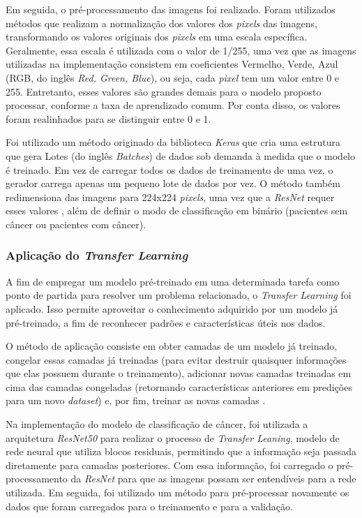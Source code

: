 Em seguida, o pré-processamento das imagens foi realizado. Foram utilizados métodos que realizam a normalização dos valores dos \textit{pixels} das imagens, transformando os valores originais dos \textit{pixels} em uma escala específica. Geralmente, essa escala é utilizada com o valor de 1/255, uma vez que as imagens utilizadas na implementação consistem em coeficientes Vermelho, Verde, Azul (RGB, do inglês \textit{Red, Green, Blue}), ou seja, cada \textit{pixel} tem um valor entre 0 e 255. Entretanto, esses valores são grandes demais para o modelo proposto processar, conforme a taxa de aprendizado comum. Por conta disso, os valores foram realinhados para se distinguir entre 0 e 1.

Foi utilizado um método originado da biblioteca \textit{Keras} que cria uma estrutura que gera Lotes (do inglês \textit{Batches}) de dados sob demanda à medida que o modelo é treinado. Em vez de carregar todos os dados de treinamento de uma vez, o gerador carrega apenas um pequeno lote de dados por vez. O método também redimensiona das imagens para 224x224 \textit{pixels}, uma vez que a \textit{ResNet} requer esses valores \cite{kerasresnet50}, além de definir o modo de classificação em binário (pacientes sem câncer ou pacientes com câncer).



\subsubsection{\esp Aplicação do \textit{Transfer Learning}} \label{transfer}

A fim de empregar um modelo pré-treinado em uma determinada tarefa como ponto de partida para resolver um problema relacionado, o \textit{Transfer Learning} foi aplicado. Isso permite aproveitar o conhecimento adquirido por um modelo já pré-treinado, a fim de reconhecer padrões e características úteis nos dados. 

O método de aplicação consiste em obter camadas de um modelo já treinado, congelar essas camadas já treinadas (para evitar destruir quaisquer informações que elas possuem durante o treinamento), adicionar novas camadas treinadas em cima das camadas congeladas (retornando características anteriores em predições para um novo \textit{dataset}) e, por fim, treinar as novas camadas \cite{kerastransfer}.

Na implementação do modelo de classificação de câncer, foi utilizada a arquitetura \textit{ResNet50} para realizar o processo de \textit{Transfer Leaning}, modelo de rede neural que utiliza blocos residuais, permitindo que a informação seja passada diretamente para camadas posteriores. Com essa informação, foi carregado o pré-processamento da \textit{ResNet} para que as imagens possam ser entendíveis para a rede utilizada. Em seguida, foi utilizado um método para pré-processar novamente os dados que foram carregados para o treinamento e para a validação.


